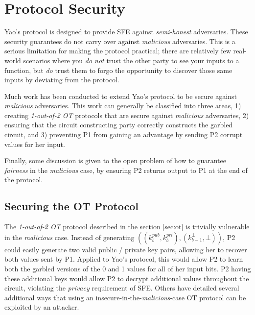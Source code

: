 \section{Protocol Security}
\label{sec:security}

Yao's protocol is designed to provide \ac{SFE} against \emph{semi-honest} adversaries. These security guarantees do not carry over against \emph{malicious} adversaries.  This is a serious limitation for making the protocol practical; there are relatively few real-world scenarios where you \emph{do not} trust the other party to see your inputs to a function, but \emph{do} trust them to forgo the opportunity to discover those same inputs by deviating from the protocol.

Much work has been conducted to extend Yao's protocol to be secure against \emph{malicious} adversaries.  This work can generally be classified into three areas, 1) creating \emph{1-out-of-2 \ac{OT}} protocols that are secure against \emph{malicious} adversaries, 2) ensuring that the circuit constructing party correctly constructs the garbled circuit, and 3) preventing \ac{P1} from gaining an advantage by sending \ac{P2} corrupt values for her input.

Finally, some discussion is given to the open problem of how to guarantee \emph{fairness} in the \emph{malicious} case, by ensuring \ac{P2} returns output to \ac{P1} at the end of the protocol.

\subsection{Securing the \ac{OT} Protocol}
\label{sec:securingot}

The \emph{1-out-of-2 \ac{OT}} protocol described in the section \ref{sec:ot} is trivially vulnerable in the \emph{malicious} case.  Instead of generating $((k^{pub}_b, k^{pri}_b), (k^\bot_{b-1}, \bot))$, \ac{P2} could easily generate two valid public / private key pairs, allowing her to recover both values sent by \ac{P1}. Applied to Yao's protocol, this would allow \ac{P2} to learn both the garbled versions of the 0 and 1 values for all of her input bits. \ac{P2} having these additional keys would allow \ac{P2} to decrypt additional values throughout the circuit, violating the \emph{privacy} requirement of \ac{SFE}.  Others have detailed several additional ways that using an insecure-in-the-\emph{malicious}-case \ac{OT} protocol can be exploited by an attacker\cite{kiraz2006protocol}.

